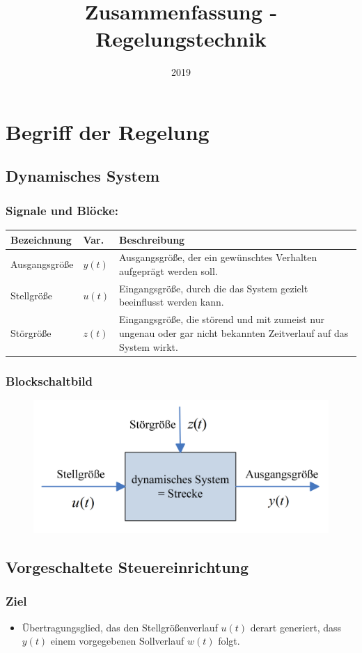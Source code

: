 \documentclass[10pt,a4paper]{article}
\title{Zusammenfassung - Regelungstechnik}
\author{}
\date{2019}
\begin{document}
	\tableofcontents
	\pagebreak
	
\section{Begriff der Regelung}

\subsection{Dynamisches System}
\subsubsection*{Signale und Blöcke:}
\begin{tabularx}{\columnwidth}{llX}
	Bezeichnung & Var. & Beschreibung \\
	\hline
	Ausgangsgröße & $y(t)$ & Ausgangsgröße, der ein gewünschtes Verhalten aufgeprägt werden soll. \\
	Stellgröße & $u(t)$ & Eingangsgröße, durch die das System gezielt beeinflusst werden kann. \\
	Störgröße & $z(t)$ & Eingangsgröße, die störend und mit zumeist nur ungenau oder gar nicht bekannten Zeitverlauf auf das System wirkt. \\
\end{tabularx}

\subsubsection*{Blockschaltbild}
\begin{figure}[H]
	\includegraphics[width=0.5\columnwidth]{imgs/abb1_3.png}
\end{figure}

\subsection{Vorgeschaltete Steuereinrichtung}
\label{steuerung}
\subsubsection*{Ziel}
\begin{itemize}
	\item Übertragungsglied, das den Stellgrößenverlauf $u(t)$ derart generiert, dass $y(t)$ einem vorgegebenen Sollverlauf $w(t)$ folgt.
\end{itemize}
\end{document}
